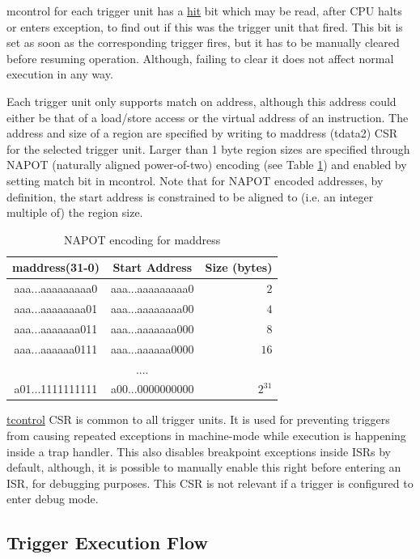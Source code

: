 \documentclass[main\_\_EN.tex]{subfiles}
\begin{document}
mcontrol for each trigger unit has a \hyperref[fielddesc:MCONTROLHIT]{hit} bit which may be read, after CPU halts or enters exception, to find out if this was the trigger unit that fired. This bit is set as soon as the corresponding trigger fires, but it has to be manually cleared before resuming operation. Although, failing to clear it does not affect normal execution in any way.

Each trigger unit only supports match on address, although this address could either be that of a load/store access or the virtual address of an instruction. The address and size of a region are specified by writing to maddress (tdata2) CSR for the selected trigger unit. Larger than 1 byte region sizes are specified through NAPOT (naturally aligned power-of-two) encoding (see Table \ref{tab:riscvcpu-hwt-table}) and enabled by setting match bit in mcontrol. Note that for NAPOT encoded addresses, by definition, the start address is constrained to be aligned to (i.e. an integer multiple of) the region size.

\begin{longtable}{ | c | c | r | }
\caption{NAPOT encoding for maddress} \label{tab:riscvcpu-hwt-table}
\\ \hline
\rowcolor{lightgray}
maddress(31-0) & Start Address & Size (bytes) \\ \hline
aaa...aaaaaaaaa0 & aaa...aaaaaaaaa0 & $2$ \\ \hline
aaa...aaaaaaaa01 & aaa...aaaaaaaa00 & $4$ \\ \hline
aaa...aaaaaaa011 & aaa...aaaaaaa000 & $8$ \\ \hline
aaa...aaaaaa0111 & aaa...aaaaaa0000 & $16$ \\ \hline
\multicolumn{3}{c}{....} \\ \hline
a01...1111111111 & a00...0000000000 & $2^{31}$ \\ \hline
\end{longtable}

\hyperref[regdesc:TCONTROL]{tcontrol} CSR is common to all trigger units. It is used for preventing triggers from causing repeated exceptions in machine-mode while execution is happening inside a trap handler. This also disables breakpoint exceptions inside ISRs by default, although, it is possible to manually enable this right before entering an ISR, for debugging purposes. This CSR is not relevant if a trigger is configured to enter debug mode.

\subsection{Trigger Execution Flow}
\label{sec:riscvcpu-hwt-suggest-op}
\end{document}
